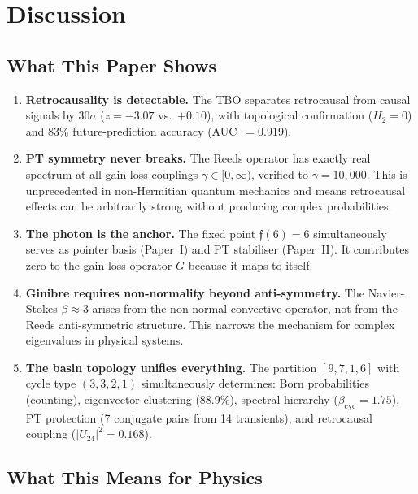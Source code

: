 \documentclass[12pt,a4paper]{article}
\theoremstyle{definition}
\theoremstyle{remark}
\newcommand{\Reeds}{\mathfrak{f}}
\begin{document}
\section{Discussion}
\label{sec:discussion}

\subsection{What This Paper Shows}

\begin{enumerate}
  \item \textbf{Retrocausality is detectable.} The TBO separates retrocausal
  from causal signals by $30\sigma$ ($z = -3.07$ vs.\ $+0.10$), with topological
  confirmation ($H_2 = 0$) and $83\%$ future-prediction accuracy (AUC~$= 0.919$).

  \item \textbf{PT symmetry never breaks.} The Reeds operator has exactly real
  spectrum at all gain-loss couplings $\gamma \in [0, \infty)$, verified to
  $\gamma = 10{,}000$. This is unprecedented in non-Hermitian quantum mechanics
  and means retrocausal effects can be arbitrarily strong without producing
  complex probabilities.

  \item \textbf{The photon is the anchor.} The fixed point $\Reeds(6) = 6$
  simultaneously serves as pointer basis (Paper~I) and PT stabiliser (Paper~II).
  It contributes zero to the gain-loss operator $G$ because it maps to itself.

  \item \textbf{Ginibre requires non-normality beyond anti-symmetry.} The
  Navier-Stokes $\beta \approx 3$ arises from the non-normal convective operator,
  not from the Reeds anti-symmetric structure. This narrows the mechanism for
  complex eigenvalues in physical systems.

  \item \textbf{The basin topology unifies everything.} The partition
  $[9,7,1,6]$ with cycle type $(3,3,2,1)$ simultaneously determines: Born
  probabilities (counting), eigenvector clustering ($88.9\%$), spectral hierarchy
  ($\beta_{\text{cyc}} = 1.75$), PT protection (7 conjugate pairs from 14
  transients), and retrocausal coupling ($|U_{24}|^2 = 0.168$).
\end{enumerate}

\subsection{What This Means for Physics}
\end{document}
